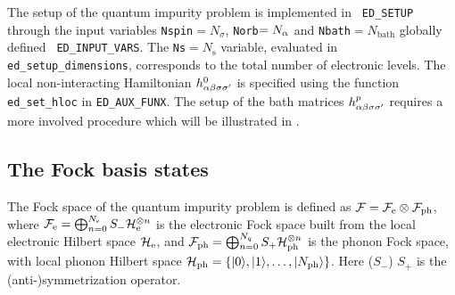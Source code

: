 \documentclass[edipack2.tex]{subfiles}
\begin{document}
The setup of the quantum impurity problem is implemented in {\tt
  ED\_SETUP} through the input variables {\tt Nspin}$=N_\sigma$,
{\tt Norb}$=N_\alpha$ and {\tt Nbath}$=N_\mathrm{bath}$ globally defined {\tt
  ED\_INPUT\_VARS}. The {\tt Ns}$=N_\mathrm{s}$ variable, evaluated in
{\tt ed\_setup\_dimensions}, corresponds to the total number of
electronic levels. 
The local non-interacting Hamiltonian
$h^0_{\alpha\beta\sigma\sigma'}$ is specified using the function {\tt ed\_set\_hloc} in {\tt ED\_AUX\_FUNX}.
The setup of the bath matrices $h^p_{\alpha\beta\sigma\sigma'}$
requires a more involved procedure which will be illustrated in
. 





















\subsection{The Fock basis states}\label{sSecBasis}
The Fock space of the quantum impurity problem is defined as
${\cal F}={\cal F}_\mathrm{e}\otimes {\cal F}_\mathrm{ph}$, where ${\cal F}_\mathrm{e}=\bigoplus_{n=0}^{N_\mathrm{s}}
S_-{\cal H}_\mathrm{e}^{\otimes n}$ is the electronic Fock space built 
from the local electronic Hilbert space ${\cal H}_\mathrm{e}$, and 
${\cal F}_\mathrm{ph}=\bigoplus_{n=0}^{N_q}S_+{\cal H}_\mathrm{ph}^{\otimes n}$
is the
phonon Fock space, with local phonon Hilbert space
${\cal H}_\mathrm{ph}=\{|0\rangle,|1\rangle,\dots,|N_\mathrm{ph}\rangle\}$. 
Here ($S_-$) $S_+$ is the (anti-)symmetrization operator.  
\end{document}
